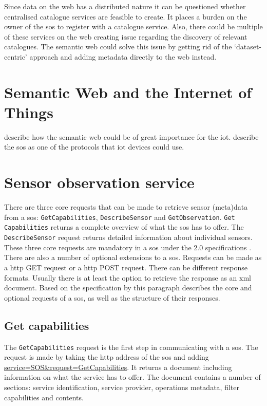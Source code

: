 Since data on the web has a distributed nature it can be questioned whether centralised catalogue services are feasible to create. It places a burden on the owner of the \ac{sos} to register with a catalogue service. Also, there could be multiple of these services on the web creating issue regarding the discovery of relevant catalogues. The semantic web could solve this issue by getting rid of the `dataset-centric' approach and adding metadata directly to the web instead.

\section{Semantic Web and the Internet of Things}
\cite{IOT:Barnaghi} describe how the semantic web could be of great importance for the \ac{iot}.
\cite{IOT:Jazayeri} describe the \ac{sos} as one of the protocols that \ac{iot} devices could use.


\section{Sensor observation service}
There are three core requests that can be made to retrieve sensor (meta)data from a \ac{sos}: \texttt{GetCapabilities}, \texttt{DescribeSensor} and \texttt{GetObservation}. \texttt{Get} \texttt{Capabilities} returns a complete overview of what the \ac{sos} has to offer. The \texttt{DescribeSensor} request returns detailed information about individual sensors. These three core requests are mandatory in a \ac{sos} under the 2.0 specifications \citep{SW:OGC2}. There are also a number of optional extensions to a \ac{sos}. Requests can be made as a \ac{http} GET request or a \ac{http} POST request. There can be different response formats. Usually there is at least the option to retrieve the response as an \ac{xml} document. Based on the specification by \cite{SW:OGC2} this paragraph describes the core and optional requests of a \ac{sos}, as well as the structure of their responses. 

\subsection{Get capabilities}
The \texttt{GetCapabilities} request is the first step in communicating with a \ac{sos}. The request is made by taking the \ac{http} address of the \ac{sos} and adding \url{service=SOS\&request=GetCapabilities}. It returns a document including information on what the service has to offer. The document contains a number of sections: service identification, service provider, operations metadata, filter capabilities and contents. 

